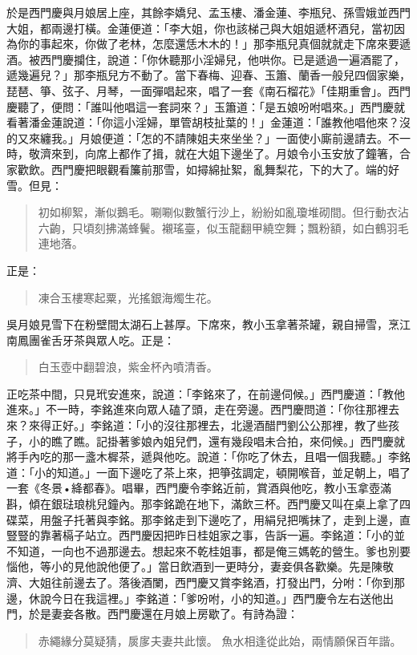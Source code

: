 於是西門慶與月娘居上座，其餘李嬌兒、孟玉樓、潘金蓮、李瓶兒、孫雪娥並西門大姐，都兩邊打橫。金蓮便道：「李大姐，你也該梯己與大姐姐遞杯酒兒，當初因為你的事起來，你做了老林，怎麼還恁木木的！」那李瓶兒真個就就走下席來要遞酒。被西門慶攔住，說道：「你休聽那小淫婦兒，他哄你。已是遞過一遍酒罷了，遞幾遍兒？」那李瓶兒方不動了。當下春梅、迎春、玉簫、蘭香一般兒四個家樂，琵琶、箏、弦子、月琴，一面彈唱起來，唱了一套《南石榴花》「佳期重會」。西門慶聽了，便問：「誰叫他唱這一套詞來？」玉簫道：「是五娘吩咐唱來。」西門慶就看著潘金蓮說道：「你這小淫婦，單管胡枝扯葉的！」金蓮道：「誰教他唱他來？沒的又來纏我。」月娘便道：「怎的不請陳姐夫來坐坐？」一面使小廝前邊請去。不一時，敬濟來到，向席上都作了揖，就在大姐下邊坐了。月娘令小玉安放了鐘箸，合家歡飲。西門慶把眼觀看簾前那雪，如撏綿扯絮，亂舞梨花，下的大了。端的好雪。但見：
\begin{quote}
初如柳絮，漸似鵝毛。唰唰似數蟹行沙上，紛紛如亂瓊堆砌間。但行動衣沾六齣，只頃刻拂滿蜂鬢。襯瑤臺，似玉龍翻甲繞空舞；飄粉額，如白鶴羽毛連地落。
\end{quote}
正是：
\begin{quote}
凍合玉樓寒起粟，光搖銀海燭生花。
\end{quote}

吳月娘見雪下在粉壁間太湖石上甚厚。下席來，教小玉拿著茶罐，親自掃雪，烹江南鳳團雀舌牙茶與眾人吃。正是：
\begin{quote}
白玉壺中翻碧浪，紫金杯內噴清香。
\end{quote}

正吃茶中間，只見玳安進來，說道：「李銘來了，在前邊伺候。」西門慶道：「教他進來。」不一時，李銘進來向眾人磕了頭，走在旁邊。西門慶問道：「你往那裡去來？來得正好。」李銘道：「小的沒往那裡去，北邊酒醋門劉公公那裡，教了些孩子，小的瞧了瞧。記掛著爹娘內姐兒們，還有幾段唱未合拍，來伺候。」西門慶就將手內吃的那一盞木樨茶，遞與他吃。說道：「你吃了休去，且唱一個我聽。」李銘道：「小的知道。」一面下邊吃了茶上來，把箏弦調定，頓開喉音，並足朝上，唱了一套《冬景•絳都春》。唱畢，西門慶令李銘近前，賞酒與他吃，教小玉拿壺滿斟，傾在銀琺琅桃兒鐘內。那李銘跪在地下，滿飲三杯。西門慶又叫在桌上拿了四碟菜，用盤子托著與李銘。那李銘走到下邊吃了，用絹兒把嘴抹了，走到上邊，直豎豎的靠著槅子站立。西門慶因把昨日桂姐家之事，告訴一遍。李銘道：「小的並不知道，一向也不過那邊去。想起來不乾桂姐事，都是俺三媽乾的營生。爹也別要惱他，等小的見他說他便了。」當日飲酒到一更時分，妻妾俱各歡樂。先是陳敬濟、大姐往前邊去了。落後酒闌，西門慶又賞李銘酒，打發出門，分咐：「你到那邊，休說今日在我這裡。」李銘道：「爹吩咐，小的知道。」西門慶令左右送他出門，於是妻妾各散。西門慶還在月娘上房歇了。有詩為證：
\begin{quote}
赤繩緣分莫疑猜，扊扅夫妻共此懷。
魚水相逢從此始，兩情願保百年諧。
\end{quote}

